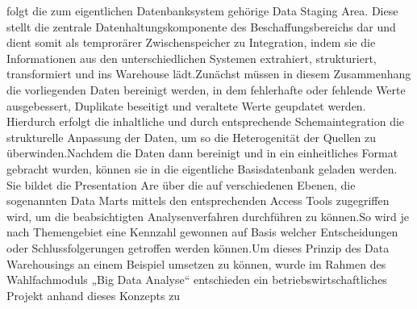 \documentclass[sigconf]{acmart}
\begin{document}
folgt die zum eigentlichen Datenbanksystem gehörige Data Staging Area. Diese stellt die zentrale Datenhaltungskomponente des Beschaffungsbereichs dar und dient somit als temprorärer Zwischenspeicher zu Integration, indem sie die Informationen aus den unterschiedlichen Systemen extrahiert, strukturiert, transformiert und ins Warehouse lädt.\newline Zunächst müssen in diesem Zusammenhang  die vorliegenden Daten bereinigt werden, in dem fehlerhafte oder fehlende Werte ausgebessert, Duplikate beseitigt und veraltete Werte geupdatet werden. Hierdurch erfolgt die inhaltliche und  durch entsprechende Schemaintegration die strukturelle Anpassung der Daten, um so die Heterogenität der Quellen zu überwinden.\newline Nachdem die Daten dann bereinigt und in ein einheitliches Format gebracht wurden, können sie in die eigentliche Basisdatenbank geladen werden. Sie bildet die Presentation Are über die auf verschiedenen Ebenen, die sogenannten Data Marts mittels den entsprechenden Access Tools zugegriffen wird, um die beabsichtigten Analysenverfahren durchführen zu können.\newline So wird je nach Themengebiet eine Kennzahl gewonnen auf Basis welcher Entscheidungen oder Schlussfolgerungen getroffen werden können.\newline Um dieses Prinzip des Data Warehousings an einem Beispiel umsetzen zu können, wurde im Rahmen des Wahlfachmoduls „Big Data Analyse“ entschieden ein betriebswirtschaftliches Projekt anhand dieses Konzepts zu 
\end{document}
